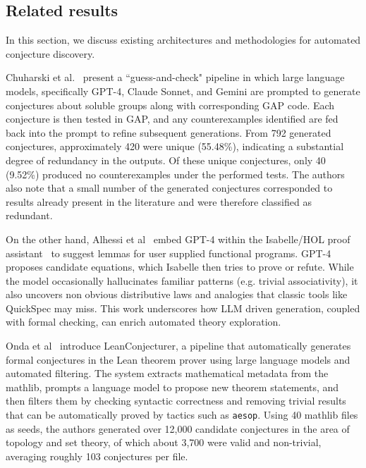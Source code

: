 \documentclass[11pt,reqno]{amsart}
\theoremstyle{plain}\newtheorem{theorem}{Theorem}[section]
\numberwithin{equation}{section}
\begin{document}
\subsection{Related results}

In this section, we discuss existing architectures and methodologies for automated conjecture discovery.

Chuharski et al.~\cite{chuharski2024mining} present a ``guess-and-check" pipeline in which large language models, specifically GPT-4, Claude Sonnet, and Gemini are prompted to generate conjectures about soluble groups along with corresponding GAP code. Each conjecture is then tested in GAP, and any counterexamples identified are fed back into the prompt to refine subsequent generations. From 792 generated conjectures, approximately 420 were unique (55.48\%), indicating a substantial degree of redundancy in the outputs. Of these unique conjectures, only 40 (9.52\%) produced no counterexamples under the performed tests. The authors also note that a small number of the generated conjectures corresponded to results already present in the literature and were therefore classified as redundant.

\medskip
\noindent
On the other hand, Alhessi et al~\cite{alhessi2025_lemmanaid} embed GPT-4 within the Isabelle/HOL proof assistant~\cite{nipkow2002isabelle} to suggest lemmas for user supplied functional programs. GPT-4 proposes candidate equations, which Isabelle then tries to prove or refute. While the model occasionally hallucinates familiar patterns (e.g. trivial associativity), it also uncovers non obvious distributive laws and analogies that classic tools like QuickSpec may miss. This work underscores how LLM driven generation, coupled with formal checking, can enrich automated theory exploration.

\medskip
\noindent
Onda et al~\cite{onda2025_leanconjecturer} introduce LeanConjecturer, a pipeline that automatically generates formal conjectures in the Lean theorem prover using large language models and automated filtering. The system extracts mathematical metadata from the mathlib, prompts a language model to propose new theorem statements, and then filters them by checking syntactic correctness and removing trivial results that can be automatically proved by tactics such as \texttt{aesop}. Using 40 mathlib files as seeds, the authors generated over 12,000 candidate conjectures in the area of topology and set theory, of which about 3,700 were valid and non-trivial, averaging roughly 103 conjectures per file.
\end{document}

